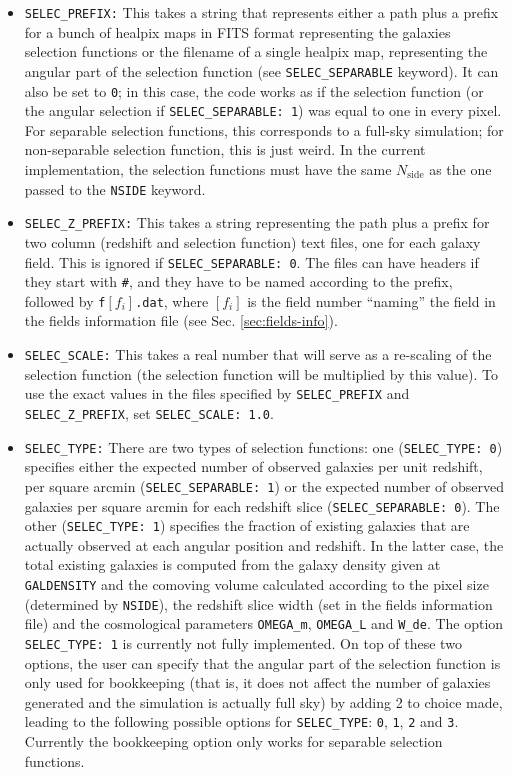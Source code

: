 \documentclass[12pt]{book} %
\newcommand{\nv}[1]{\mathrm{#1}}                 %
\begin{document}
\begin{itemize}
\item {\tt SELEC\_PREFIX:} This takes a string that represents either a path plus a prefix for 
  a bunch of {\sc healpix} maps in FITS format representing the galaxies selection functions 
  or the filename of a single {\sc healpix} map, representing the angular 
  part of the selection function (see {\tt SELEC\_SEPARABLE} keyword). It can also be set to 
  {\tt 0}; in this case, the code works as if the selection function (or the angular selection 
  if {\tt SELEC\_SEPARABLE: 1}) was equal to one in every pixel. For separable selection functions, 
  this corresponds to a full-sky simulation; for non-separable selection function, this is just weird. 
  In the current implementation, the selection functions must have the same $N_{\nv{side}}$ as the one 
  passed to the {\tt NSIDE} keyword.

\item {\tt SELEC\_Z\_PREFIX:} This takes a string representing the path plus a prefix for 
  two column (redshift and selection function) text files, one for each galaxy field. 
  This is ignored if {\tt SELEC\_SEPARABLE: 0}. The files can have headers if they start with {\tt \#}, 
  and they have to be named according to the prefix, followed by {\tt f}$[f_i]${\tt .dat}, where 
  $[f_i]$ is the field number ``naming'' the field in the fields information file (see Sec. 
  \ref{sec:fields-info}).

 \item {\tt SELEC\_SCALE:} This takes a real number that will serve as a re-scaling of the selection 
   function (the selection function will be multiplied by this value). To use the exact values in the 
   files specified by {\tt SELEC\_PREFIX} and {\tt SELEC\_Z\_PREFIX}, set {\tt SELEC\_SCALE: 1.0}.

\item {\tt SELEC\_TYPE:} There are two types of selection functions: one ({\tt SELEC\_TYPE: 0}) 
  specifies either the expected number of observed galaxies per unit redshift, per square arcmin 
  ({\tt SELEC\_SEPARABLE: 1}) or the expected number of observed galaxies per square arcmin for each 
  redshift slice ({\tt SELEC\_SEPARABLE: 0}). The other ({\tt SELEC\_TYPE: 1}) specifies the 
  fraction of existing galaxies that are actually observed at each angular 
  position and redshift. In the latter case, the total existing galaxies 
  is computed from the galaxy density given at {\tt GALDENSITY} and the comoving volume calculated 
  according to the pixel size (determined by {\tt NSIDE}), the redshift slice width (set in the 
  fields information file) and the cosmological parameters {\tt OMEGA\_m}, {\tt OMEGA\_L} and 
  {\tt W\_de}. The option {\tt SELEC\_TYPE: 1} is currently not fully implemented. On top of these 
  two options, the user can specify that the angular part of the selection function is only 
  used for bookkeeping (that is, it does not affect the number of galaxies generated and the 
  simulation is actually full sky) by adding 2 to choice made, leading to the following possible 
  options for {\tt SELEC\_TYPE}: {\tt 0}, {\tt 1}, {\tt 2} and {\tt 3}. Currently the bookkeeping 
  option only works for separable selection functions. 


\end{itemize}
\end{document}
